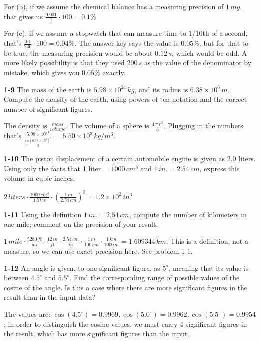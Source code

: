 \documentclass{amsart}
\begin{document}
For (b), if we assume the chemical balance has a measuring precision of $1\,mg$,
that gives us $\frac{0.001}{1} \cdot 100 = 0.1\%$

For (c), if we assume a stopwatch that can measure time to 1/10th of a second,
that's $\frac{0.1}{240} \cdot 100 = 0.04\%$.
The answer key says the value is $0.05\%$, but for that to be true,
the measuring precision would be about $0.12\,s$, which would be odd.
A more likely possibility is that they used $200\,s$ as the value of the denominator by mistake,
which gives you $0.05\%$ exactly.

\textbf{1-9} The mass of the earth is $5.98 \times 10^{24}\,kg$, and its radius
is $6.38 \times 10^{6}\,m$.  Compute the density of the earth, using powers-of-ten
notation and the correct number of significant figures.

The density is $\frac{mass}{volume}$.  The volume of a sphere is $\frac{4\,\pi\,r^{3}}{3}$.
Plugging in the numbers that's $\frac{5.98 \times 10^{24}}{\frac{4\,\pi(6.38\times 10^{6})^{3}}{3}}$
= $5.50 \times 10^{3}\,kg/m^{3}$.

\textbf{1-10} The piston displacement of a certain automobile engine is given as 2.0 liters.
Using only the facts that 1 liter = $1000\,cm^{3}$ and $1\,in. = 2.54\,cm$, express this volume
in cubic inches.

$2\,liters\cdot\frac{1000\,cm^{3}}{1\,liter}\cdot(\frac{1\,in}{2.54\,cm})^{3} = 1.2\times10^{2}\,in^{3}$

\textbf{1-11} Using the definition $1\,in. = 2.54\,cm$, compute the number of kilometers in one mile;
comment on the precision of your result.

$1\,mile\cdot\frac{5280\,ft}{mi}\cdot\frac{12\,in}{ft}\cdot\frac{2.54\,cm}{in}\cdot\frac{1\,m}{100\,cm}
\cdot\frac{1\,km}{1000\,m} = 1.609344\,km$.
This is a definition, not a measure, so we can use exact precision here.  See problem 1-1.

\textbf{1-12} An angle is given, to one significant figure, as $5^{\circ}$, meaning that its
value is between $4.5^{\circ}$ and $5.5^{\circ}$.
Find the corresponding range of possible values of the cosine of the angle.
Is this a case where there are more significant figures in the result than in the input data?

The values are: $\cos(4.5^{\circ}) = 0.9969, \cos(5.0^{\circ}) = 0.9962, \cos(5.5^{\circ}) = 0.9954$;
in order to distinguish the cosine values, we must carry 4 significant figures in the result,
which has more significant figures than the input.
\end{document}
